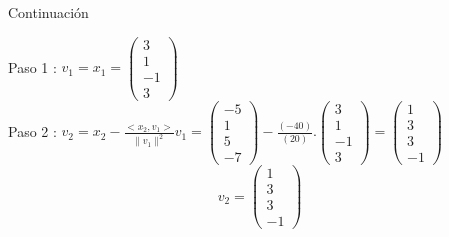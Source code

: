 \documentclass[11pt]{beamer}
\begin{document}
\begin{frame}{Continuación}

     Paso 1 : $ v_1 = x_1 = \begin{pmatrix}
     3 \\ 1 \\ -1 \\ 3
    \end{pmatrix} $ \\
    Paso 2 : 
     $ v_2 = x_2 - \frac{<x_2,v_1>}{\parallel v_1 \parallel ^2} v_1   = \begin{pmatrix}
         -5 \\ 1 \\ 5 \\ -7 
     \end{pmatrix} - \frac{(-40)}{(20)} . \begin{pmatrix}
         3 \\ 1 \\ -1 \\ 3
     \end{pmatrix} = \begin{pmatrix}
         1 \\ 3 \\ 3 \\ -1
     \end{pmatrix}$ \\ 
     \begin{equation*}
         v_2 =\begin{pmatrix}
         1 \\ 3 \\ 3 \\ -1
     \end{pmatrix} 
     \end{equation*}
     
\end{frame}
\end{document}
